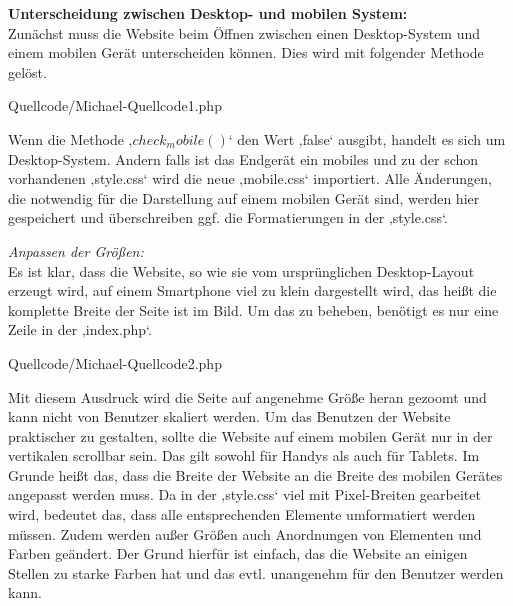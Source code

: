 \textbf{Unterscheidung zwischen Desktop- und mobilen System:}
\\
Zunächst muss die Website beim Öffnen zwischen einen Desktop-System und einem mobilen Gerät unterscheiden können. Dies wird mit folgender Methode gelöst.

\begin{center}
	\begin{lstinputlisting}[language=PHP, caption={Unterscheidung Desktop und mobiles Gerät}]
		{Quellcode/Michael-Quellcode1.php}
	\end{lstinputlisting}
\end{center}

Wenn die Methode $‚check_mobile()‘$ den Wert ‚false‘ ausgibt, handelt es sich um Desktop-System. Andern falls ist das Endgerät ein mobiles und zu der schon vorhandenen ‚style.css‘ wird die neue ‚mobile.css‘ importiert. Alle Änderungen, die notwendig für die Darstellung auf einem mobilen Gerät sind, werden hier gespeichert und überschreiben ggf. die Formatierungen in der ‚style.css‘.

\textit{Anpassen der Größen:}
\\
Es ist klar, dass die Website, so wie sie  vom ursprünglichen Desktop-Layout erzeugt wird, auf einem Smartphone viel zu klein dargestellt wird, das heißt die komplette Breite der Seite ist im Bild. Um das zu beheben, benötigt es nur eine Zeile in der ‚index.php‘.

\begin{center}
	\begin{lstinputlisting}[language=PHP, caption={Auszug aus der Index-Datei}]
		{Quellcode/Michael-Quellcode2.php}
	\end{lstinputlisting}
\end{center}

Mit diesem Ausdruck wird die Seite auf angenehme Größe heran gezoomt und kann nicht von Benutzer skaliert werden. 
Um das Benutzen der Website praktischer zu gestalten, sollte die Website auf einem mobilen Gerät nur in der vertikalen scrollbar sein. Das gilt sowohl für Handys als auch für Tablets. Im Grunde heißt das, dass die Breite der Website an die Breite des mobilen Gerätes angepasst werden muss. Da in der ‚style.css‘ viel mit Pixel-Breiten gearbeitet wird, bedeutet das, dass alle entsprechenden Elemente umformatiert werden müssen.
Zudem werden außer Größen auch Anordnungen von Elementen und Farben geändert. Der Grund hierfür ist einfach, das die Website an einigen Stellen zu starke Farben hat und das evtl. unangenehm für den Benutzer werden kann. 

